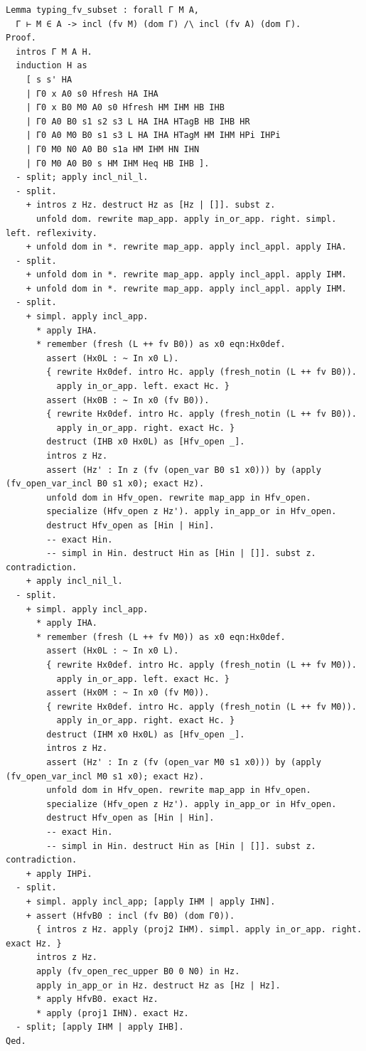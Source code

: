 \begin{latin}
\begin{verbatim}
Lemma typing_fv_subset : forall Γ M A,
  Γ ⊢ M ∈ A -> incl (fv M) (dom Γ) /\ incl (fv A) (dom Γ).
Proof.
  intros Γ M A H.
  induction H as
    [ s s' HA
    | Γ0 x A0 s0 Hfresh HA IHA
    | Γ0 x B0 M0 A0 s0 Hfresh HM IHM HB IHB
    | Γ0 A0 B0 s1 s2 s3 L HA IHA HTagB HB IHB HR
    | Γ0 A0 M0 B0 s1 s3 L HA IHA HTagM HM IHM HPi IHPi
    | Γ0 M0 N0 A0 B0 s1a HM IHM HN IHN
    | Γ0 M0 A0 B0 s HM IHM Heq HB IHB ].
  - split; apply incl_nil_l.
  - split.
    + intros z Hz. destruct Hz as [Hz | []]. subst z.
      unfold dom. rewrite map_app. apply in_or_app. right. simpl. left. reflexivity.
    + unfold dom in *. rewrite map_app. apply incl_appl. apply IHA.
  - split.
    + unfold dom in *. rewrite map_app. apply incl_appl. apply IHM.
    + unfold dom in *. rewrite map_app. apply incl_appl. apply IHM.
  - split.
    + simpl. apply incl_app.
      * apply IHA.
      * remember (fresh (L ++ fv B0)) as x0 eqn:Hx0def.
        assert (Hx0L : ~ In x0 L).
        { rewrite Hx0def. intro Hc. apply (fresh_notin (L ++ fv B0)).
          apply in_or_app. left. exact Hc. }
        assert (Hx0B : ~ In x0 (fv B0)).
        { rewrite Hx0def. intro Hc. apply (fresh_notin (L ++ fv B0)).
          apply in_or_app. right. exact Hc. }
        destruct (IHB x0 Hx0L) as [Hfv_open _].
        intros z Hz.
        assert (Hz' : In z (fv (open_var B0 s1 x0))) by (apply (fv_open_var_incl B0 s1 x0); exact Hz).
        unfold dom in Hfv_open. rewrite map_app in Hfv_open.
        specialize (Hfv_open z Hz'). apply in_app_or in Hfv_open.
        destruct Hfv_open as [Hin | Hin].
        -- exact Hin.
        -- simpl in Hin. destruct Hin as [Hin | []]. subst z. contradiction.
    + apply incl_nil_l.
  - split.
    + simpl. apply incl_app.
      * apply IHA.
      * remember (fresh (L ++ fv M0)) as x0 eqn:Hx0def.
        assert (Hx0L : ~ In x0 L).
        { rewrite Hx0def. intro Hc. apply (fresh_notin (L ++ fv M0)).
          apply in_or_app. left. exact Hc. }
        assert (Hx0M : ~ In x0 (fv M0)).
        { rewrite Hx0def. intro Hc. apply (fresh_notin (L ++ fv M0)).
          apply in_or_app. right. exact Hc. }
        destruct (IHM x0 Hx0L) as [Hfv_open _].
        intros z Hz.
        assert (Hz' : In z (fv (open_var M0 s1 x0))) by (apply (fv_open_var_incl M0 s1 x0); exact Hz).
        unfold dom in Hfv_open. rewrite map_app in Hfv_open.
        specialize (Hfv_open z Hz'). apply in_app_or in Hfv_open.
        destruct Hfv_open as [Hin | Hin].
        -- exact Hin.
        -- simpl in Hin. destruct Hin as [Hin | []]. subst z. contradiction.
    + apply IHPi.
  - split.
    + simpl. apply incl_app; [apply IHM | apply IHN].
    + assert (HfvB0 : incl (fv B0) (dom Γ0)).
      { intros z Hz. apply (proj2 IHM). simpl. apply in_or_app. right. exact Hz. }
      intros z Hz.
      apply (fv_open_rec_upper B0 0 N0) in Hz.
      apply in_app_or in Hz. destruct Hz as [Hz | Hz].
      * apply HfvB0. exact Hz.
      * apply (proj1 IHN). exact Hz.
  - split; [apply IHM | apply IHB].
Qed.


\end{verbatim}
\end{latin}
